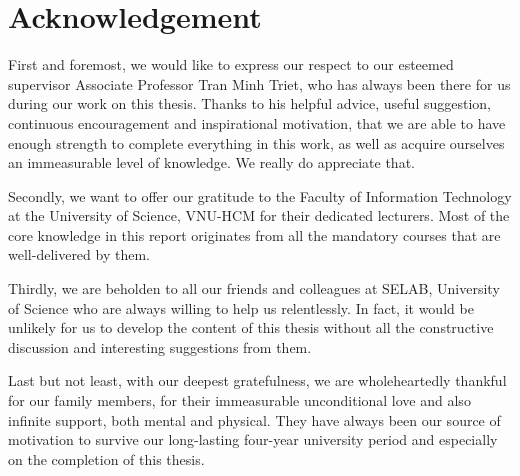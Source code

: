 \chapter{Acknowledgement}




First and foremost, we would like to express our respect to our esteemed supervisor Associate Professor Tran Minh Triet, who has always been there for us during our work on this thesis. Thanks to his helpful advice, useful suggestion, continuous encouragement and inspirational motivation, that we are able to have enough strength to complete everything in this work, as well as acquire ourselves an immeasurable level of knowledge. We really do appreciate that. 

Secondly, we want to offer our gratitude to the Faculty of Information Technology at the University of Science, VNU-HCM for their dedicated lecturers.  Most of the core knowledge in this report originates from all the mandatory courses that are well-delivered by them.

Thirdly, we are beholden to all our friends and colleagues at SELAB, University of Science who are always willing to help us relentlessly. In fact, it would be unlikely for us to develop the content of this thesis without all the constructive discussion and interesting suggestions from them.

Last but not least, with our deepest gratefulness, we are wholeheartedly thankful for our family members, for their immeasurable unconditional love and also infinite support, both mental and physical. They have always been our source of motivation to survive our long-lasting four-year university period and especially on the completion of this thesis.

